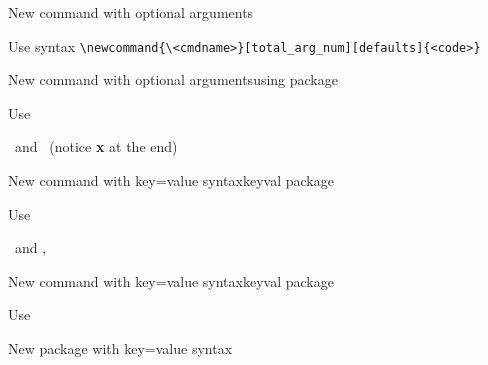 \graphicspath{{sec07/images/}{sec07/code/}}
\lstset{inputpath=sec07/code/}

\begin{frame}[fragile]{New command with optional arguments\magicPage}\relax
{}

Use syntax \verb|\newcommand{\<cmdname>}[total_arg_num][defaults]{<code>}|
\end{frame}

\begin{frame}[fragile]{New command with optional arguments\magicPage}{using package}\relax
{}

Use \ncol\usepackage{xargs}\ and \ccol{}\ (notice \textbf{x} at the end)

\end{frame}

\begin{frame}[fragile]{New command with key=value syntax\magicPage}{keyval package}\relax
{}

Use \ncol\usepackage{keyval}\ and , \ccol{\setkeys}

\end{frame}


\begin{frame}[fragile]{New command with key=value syntax\magicPage}{keyval package}\relax
{}

Use \ncol\usepackage{pgfkeys}

\end{frame}


\begin{frame}[fragile]{New package with key=value syntax\magicPage}\relax





\end{frame}